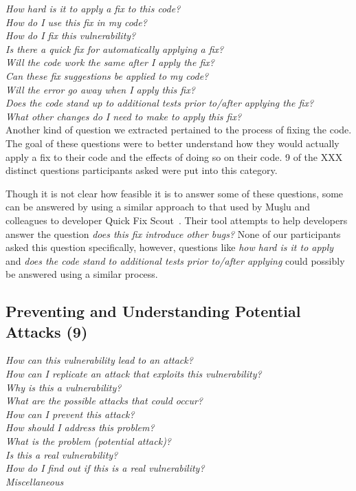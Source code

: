 \documentclass[conference]{IEEEtran}
\begin{document}
\noindent\emph{How hard is it to apply a fix to this code?} \\
\emph{How do I use this fix in my code?} \\
\emph{How do I fix this vulnerability?} \\
\emph{Is there a quick fix for automatically applying a fix?} \\
\emph{Will the code work the same after I apply the fix?} \\
\emph{Can these fix suggestions be applied to my code?} \\
\emph{Will the error go away when I apply this fix?} \\
\emph{Does the code stand up to additional tests prior to/after applying the fix?} \\
\emph{What other changes do I need to make to apply this fix?} \\

Another kind of question we extracted pertained to the process of fixing the code. The goal of these questions were to better understand how they would actually apply a fix to their code and the effects of doing so on their code. 9 of the XXX distinct questions participants asked were put into this category.

Though it is not clear how feasible it is to answer some of these questions, some can be answered by using a similar approach to that used by Mu{\c{s}}lu and colleagues to developer Quick Fix Scout~\cite{mucslu2012speculative}. Their tool attempts to help developers answer the question \emph{does this fix introduce other bugs?} None of our participants asked this question specifically, however, questions like \emph{how hard is it to apply} and \emph{does the code stand to additional tests prior to/after applying} could possibly be answered using a similar process.

  


\noindent\subsection{\textbf{Preventing and Understanding Potential Attacks (9)}}

\noindent\emph{How can this vulnerability lead to an attack?} \\
\emph{How can I replicate an attack that exploits this vulnerability?} \\
\emph{Why is this a vulnerability?} \\
\emph{What are the possible attacks that could occur?} \\
\emph{How can I prevent this attack?} \\
\emph{How should I address this problem? } \\
\emph{What is the problem (potential attack)?} \\
\emph{Is this a real vulnerability?} \\
\emph{How do I find out if this is a real vulnerability?} \\
\emph{Miscellaneous} \\
\end{document}
